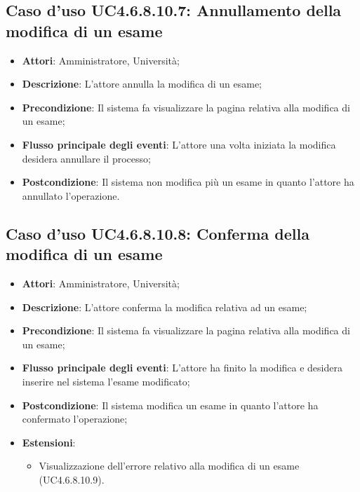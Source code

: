 \subsection{Caso d'uso \texorpdfstring{UC4.6.8.10.7}{UC4.6.8.10.7}: Annullamento della modifica di un esame}
\begin{itemize}
	\item \textbf{Attori}: Amministratore, Università;
	\item \textbf{Descrizione}: L'attore annulla la modifica di un esame;
	
	\item \textbf{Precondizione}: Il sistema fa visualizzare la pagina relativa alla modifica di un esame;
	
	
	\item \textbf{Flusso principale degli eventi}: L'attore una volta iniziata la modifica desidera annullare il processo;
	
	\item \textbf{Postcondizione}: Il sistema non modifica più un esame in quanto l'attore ha annullato l'operazione.
	
	
\end{itemize}
\subsection{Caso d'uso \texorpdfstring{UC4.6.8.10.8}{UC4.6.8.10.8}: Conferma della modifica di un esame}
\begin{itemize}
	\item \textbf{Attori}: Amministratore, Università;
	\item \textbf{Descrizione}: L'attore conferma la modifica relativa ad un esame;
	
	\item \textbf{Precondizione}: Il sistema fa visualizzare la pagina relativa alla modifica di un esame;
	
	\item \textbf{Flusso principale degli eventi}: L'attore ha finito la modifica e desidera inserire nel sistema l'esame modificato;
	
	\item \textbf{Postcondizione}: Il sistema modifica un esame in quanto l'attore ha confermato l'operazione;
	
	
	\item \textbf{Estensioni}:
	\begin{itemize}
		\item Visualizzazione dell'errore relativo alla modifica di un esame (UC4.6.8.10.9).
	\end{itemize}
\end{itemize}
